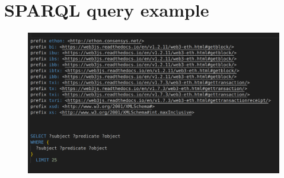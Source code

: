 
\chapter{SPARQL query example}
\begin{center}
	\begin{figure}[htb!]
		
		\begin{minipage}{0.43\linewidth}
			\centering
			\includegraphics[width=1.95\textwidth]{images/chap03_sparql_query_1.png}
		\end{minipage}
		
	\end{figure}
	
\end{center}